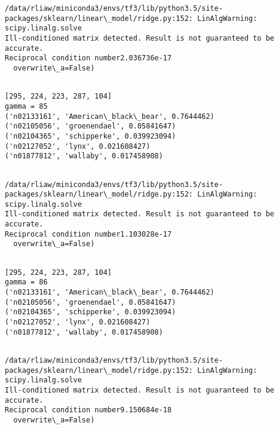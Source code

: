 \documentclass[11pt]{article}
\begin{document}
    \begin{Verbatim}[commandchars=\\\{\}]
/data/rliaw/miniconda3/envs/tf3/lib/python3.5/site-packages/sklearn/linear\_model/ridge.py:152: LinAlgWarning: scipy.linalg.solve
Ill-conditioned matrix detected. Result is not guaranteed to be accurate.
Reciprocal condition number2.036736e-17
  overwrite\_a=False)

    \end{Verbatim}

    \begin{Verbatim}[commandchars=\\\{\}]

[295, 224, 223, 287, 104]
gamma = 85
('n02133161', 'American\_black\_bear', 0.7644462)
('n02105056', 'groenendael', 0.05841647)
('n02104365', 'schipperke', 0.039923094)
('n02127052', 'lynx', 0.021608427)
('n01877812', 'wallaby', 0.017458908)


    \end{Verbatim}

    \begin{Verbatim}[commandchars=\\\{\}]
/data/rliaw/miniconda3/envs/tf3/lib/python3.5/site-packages/sklearn/linear\_model/ridge.py:152: LinAlgWarning: scipy.linalg.solve
Ill-conditioned matrix detected. Result is not guaranteed to be accurate.
Reciprocal condition number1.103028e-17
  overwrite\_a=False)

    \end{Verbatim}

    \begin{Verbatim}[commandchars=\\\{\}]

[295, 224, 223, 287, 104]
gamma = 86
('n02133161', 'American\_black\_bear', 0.7644462)
('n02105056', 'groenendael', 0.05841647)
('n02104365', 'schipperke', 0.039923094)
('n02127052', 'lynx', 0.021608427)
('n01877812', 'wallaby', 0.017458908)


    \end{Verbatim}

    \begin{Verbatim}[commandchars=\\\{\}]
/data/rliaw/miniconda3/envs/tf3/lib/python3.5/site-packages/sklearn/linear\_model/ridge.py:152: LinAlgWarning: scipy.linalg.solve
Ill-conditioned matrix detected. Result is not guaranteed to be accurate.
Reciprocal condition number9.150684e-18
  overwrite\_a=False)

    \end{Verbatim}
\end{document}
